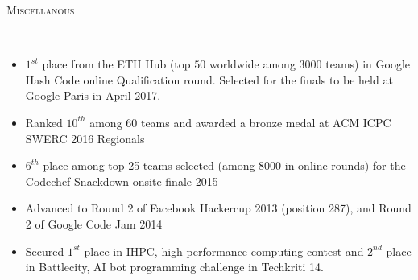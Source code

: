\documentclass[9pt]{article}
\newenvironment{changemargin}[2]{%
  \begin{list}{}{%
    \setlength{\topsep}{0pt}%
    \setlength{\leftmargin}{#1}%
    \setlength{\rightmargin}{#2}%
    \setlength{\listparindent}{\parindent}%
    \setlength{\itemindent}{\parindent}%
    \setlength{\parsep}{\parskip}%
  }%
  \item[]}{\end{list}
}
\newcommand{\lineover}{
	\begin{changemargin}{-0.05in}{-0.10in}
		\vspace*{-9pt}
		\hrulefill \\
		\vspace*{-2pt}
	\end{changemargin}
}
\newcommand{\header}[1]{
	\begin{changemargin}{-0.5in}{-0.5in}
		\scshape{#1}\\
  	\lineover
	\end{changemargin}
}
\newenvironment{body} {
	\vspace*{-16pt}
	\begin{changemargin}{-0.6in}{-0.65in}
  }	
	{\end{changemargin}
}
\begin{document}
\vspace{1 mm}
\header{Miscellanous}
\begin{body}
	\vspace{14pt}
	\begin{changemargin}{0.15in}{0.15in}
	\begin{itemize}
          \item $1^{st}$ place from the ETH Hub (top $50$ worldwide among 3000 teams) in Google Hash Code online Qualification round.
              Selected for the finals to be held at Google Paris in April 2017.
          \item Ranked $10^{th}$ among 60 teams and awarded a bronze medal at ACM ICPC SWERC 2016 Regionals
	  \item $6^{th}$ place among top 25 teams selected (among 8000 in online rounds) for the Codechef Snackdown onsite finale 2015 \\
 	  \item Advanced to Round 2 of Facebook Hackercup 2013 (position 287), and Round 2 of Google Code Jam 2014 \\
	  \item Secured $1^{st}$ place in IHPC, high performance computing contest and $2^{nd}$ place in Battlecity, AI bot programming challenge in Techkriti 14. \\
	\end{itemize}
        \end{changemargin}
\end{body}
\end{document}
